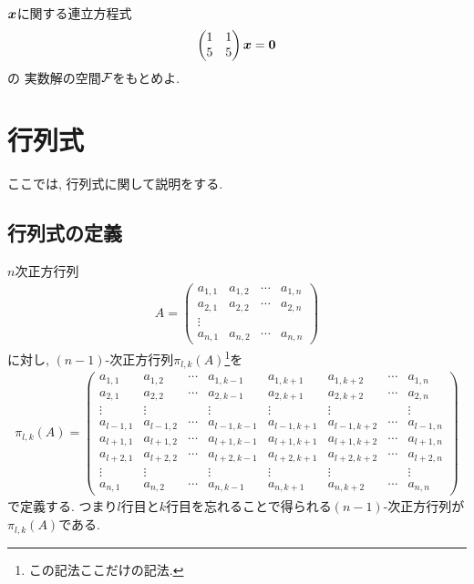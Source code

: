 \begin{quiz}
  \label{quiz:3:10}
  $\boldsymbol{x}$に関する連立方程式
  \begin{align*}
    \begin{pmatrix}1&1\\5&5\end{pmatrix}
      \boldsymbol{x}
      =\boldsymbol{0}
  \end{align*}
  の
  実数解の空間$\mathcal{F}$をもとめよ.
\end{quiz}



\chapter{行列式}
\label{chap:det}
ここでは,
行列式に関して説明をする.


\section{行列式の定義}

$n$次正方行列
 \begin{align*}
  A=
  \begin{pmatrix}
    a_{1,1}&a_{1,2}&\cdots&a_{1,n}\\
    a_{2,1}&a_{2,2}&\cdots&a_{2,n}\\
    \vdots\\
    a_{n,1}&a_{n,2}&\cdots&a_{n,n}
  \end{pmatrix}
  \end{align*}
  に対し,
  $(n-1)$-次正方行列$\pi_{l,k}(A)$\footnote{この記法ここだけの記法.}を
  \begin{align*}
    \pi_{l,k}(A)=
    \left(
  \begin{array}{cccc|cccc}
    a_{1,1}&a_{1,2}&\cdots&a_{1,k-1}&a_{1,k+1}&a_{1,k+2}&\cdots&a_{1,n}\\
    a_{2,1}&a_{2,2}&\cdots&a_{2,k-1}&a_{2,k+1}&a_{2,k+2}&\cdots&a_{2,n}\\
    \vdots&\vdots&&\vdots&\vdots&\vdots&&\vdots\\
    a_{l-1,1}&a_{l-1,2}&\cdots&a_{l-1,k-1}&a_{l-1,k+1}&a_{l-1,k+2}&\cdots&a_{l-1,n}\\\hline
    a_{l+1,1}&a_{l+1,2}&\cdots&a_{l+1,k-1}&a_{l+1,k+1}&a_{l+1,k+2}&\cdots&a_{l+1,n}\\
    a_{l+2,1}&a_{l+2,2}&\cdots&a_{l+2,k-1}&a_{l+2,k+1}&a_{l+2,k+2}&\cdots&a_{l+2,n}\\
    \vdots&\vdots&&\vdots&\vdots&\vdots&&\vdots\\
    a_{n,1}&a_{n,2}&\cdots&a_{n,k-1}&a_{n,k+1}&a_{n,k+2}&\cdots&a_{n,n}
  \end{array}
  \right)
\end{align*}
  で定義する.
  つまり$l$行目と$k$行目を忘れることで得られる$(n-1)$-次正方行列が$\pi_{l,k}(A)$である.


